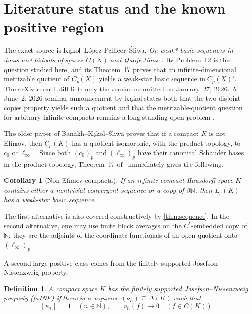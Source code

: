 \documentclass[11pt]{article}
\newtheorem{corollary}[theorem]{Corollary}
\newtheorem{definition}[theorem]{Definition}
\newcommand{\Cp}{C_p}
\newcommand{\Lp}{L_p}
\newcommand{\N}{\mathbb{N}}
\newcommand{\czerop}{(c_0)_p}
\newcommand{\linfyp}{(\ell_\infty)_p}
\begin{document}
\section{Literature status and the known positive region}\label{sec:literature}

The exact source is K\k{a}kol--L\'opez-Pellicer--\'Sliwa,
\emph{On weak*-basic sequences in duals and biduals of spaces $C(X)$ and
Quojections}~\cite{KLS2026}.  Its Problem~12 is the question studied here, and
its Theorem~17 proves that an infinite-dimensional metrizable quotient of
$\Cp(X)$ yields a weak-star basic sequence in $\Cp(X)'$.  The arXiv record
still lists only the version submitted on January~27, 2026.  A June~2, 2026
seminar announcement by K\k{a}kol states both that the two-disjoint-copies
property yields such a quotient and that the metrizable-quotient question for
arbitrary infinite compacta remains a long-standing open problem
\cite{KakolSeminar2026}.

The older paper of Banakh--K\k{a}kol--\'Sliwa proves that if a compact $K$ is
not Efimov, then $\Cp(K)$ has a quotient isomorphic, with the product topology,
to $c_0$ or $\ell_\infty$~\cite[Corollary~3]{BKS2018MQ}.  Since both
$\czerop$ and $\linfyp$ have their canonical Schauder bases in the product
topology, Theorem~17 of~\cite{KLS2026} immediately gives the following.

\begin{corollary}[Non-Efimov compacta]\label{cor:non-efimov}
If an infinite compact Hausdorff space $K$ contains either a nontrivial
convergent sequence or a copy of $\beta\N$, then $\Lp(K)$ has a weak-star
basic sequence.
\end{corollary}

The first alternative is also covered constructively by \cref{thm:sequence}.
In the second alternative, one may use finite block averages on the
$C^*$-embedded copy of $\N$; they are the adjoints of the coordinate
functionals of an open quotient onto $\linfyp$.

A second large positive class comes from the finitely supported
Josefson--Nissenzweig property.

\begin{definition}
A compact space $K$ has the \emph{finitely supported
Josefson--Nissenzweig property} (fsJNP) if there is a sequence
$(\nu_n)\subseteq\Delta(K)$ such that
\[
 \|\nu_n\|=1\quad(n\in\N),
 \qquad
 \nu_n(f)\longrightarrow0\quad(f\in C(K)).
\]
\end{definition}
\end{document}
